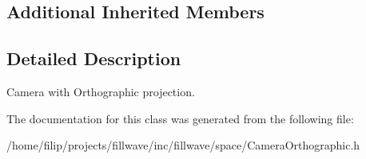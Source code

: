 \subsection*{Additional Inherited Members}


\subsection{Detailed Description}
Camera with Orthographic projection. 

The documentation for this class was generated from the following file\+:\begin{DoxyCompactItemize}
\item 
/home/filip/projects/fillwave/inc/fillwave/space/Camera\+Orthographic.\+h\end{DoxyCompactItemize}
